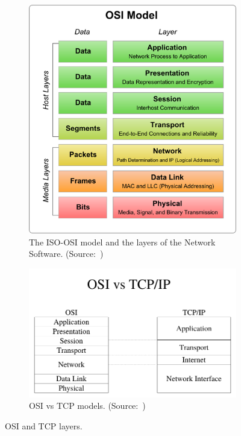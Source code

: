 \documentclass[12pt, oneandhalf, chaparabic, sees, ms]{metu}
\begin{document}
\begin{figure}[!tbp]
  \begin{subfigure}[b]{0.48\textwidth}
    \includegraphics[width=\textwidth]{osimodel.png}
    \caption{The ISO-OSI model and the layers of the Network Software. (Source:~\protect\cite{osimodel})}
    \label{fig:osimodel}
  \end{subfigure}
  \hfill
  \begin{subfigure}[b]{0.48\textwidth}
    \includegraphics[width=\textwidth]{osi-tcp.png}
    \caption{OSI vs TCP models. (Source:~\protect\cite{bathula2007})}
    \label{fig:osi-tcp}
  \end{subfigure}
  \caption{OSI and TCP layers.}
\end{figure}
\end{document}
